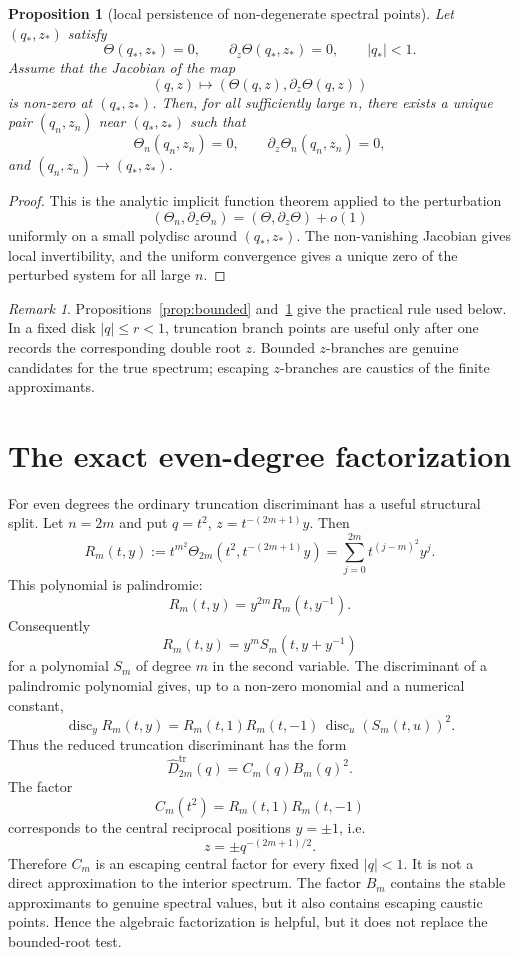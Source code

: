 \documentclass[11pt,a4paper,reqno]{amsart}
\newtheorem{proposition}[theorem]{Proposition}
\theoremstyle{remark}
\newtheorem{remark}[theorem]{Remark}
\newcommand{\disc}{\operatorname{disc}}
\newcommand{\Th}{\Theta}
\newcommand{\tr}{\mathrm{tr}}
\begin{document}
\begin{proposition}[local persistence of non-degenerate spectral points]\label{prop:persistence}
Let $(q_*,z_*)$ satisfy
\[
  \Th(q_*,z_*)=0,
  \qquad
  \partial_z\Th(q_*,z_*)=0,
  \qquad |q_*|<1.
\]
Assume that the Jacobian of the map
\[
  (q,z)\longmapsto (\Th(q,z),\partial_z\Th(q,z))
\]
is non-zero at $(q_*,z_*)$.  Then, for all sufficiently large $n$, there exists a unique pair $(q_n,z_n)$ near $(q_*,z_*)$ such that
\[
  \Th_n(q_n,z_n)=0,
  \qquad
  \partial_z\Th_n(q_n,z_n)=0,
\]
and $(q_n,z_n)\to(q_*,z_*)$.
\end{proposition}

\begin{proof}
This is the analytic implicit function theorem applied to the perturbation
\[
  (\Th_n,\partial_z\Th_n)=(\Th,\partial_z\Th)+o(1)
\]
uniformly on a small polydisc around $(q_*,z_*)$.  The non-vanishing Jacobian gives local invertibility, and the uniform convergence gives a unique zero of the perturbed system for all large $n$.
\end{proof}

\begin{remark}
Propositions~\ref{prop:bounded} and~\ref{prop:persistence} give the practical rule used below.  In a fixed disk $|q|\leq r<1$, truncation branch points are useful only after one records the corresponding double root $z$.  Bounded $z$-branches are genuine candidates for the true spectrum; escaping $z$-branches are caustics of the finite approximants.
\end{remark}

\section{The exact even-degree factorization}
For even degrees the ordinary truncation discriminant has a useful structural split.  Let $n=2m$ and put $q=t^2$, $z=t^{-(2m+1)}y$.  Then
\[
  R_m(t,y):=t^{m^2}\Th_{2m}(t^2,t^{-(2m+1)}y)
  =\sum_{j=0}^{2m}t^{(j-m)^2}y^j .
\]
This polynomial is palindromic:
\[
  R_m(t,y)=y^{2m}R_m(t,y^{-1}).
\]
Consequently
\[
  R_m(t,y)=y^m S_m(t,y+y^{-1})
\]
for a polynomial $S_m$ of degree $m$ in the second variable.  The discriminant of a palindromic polynomial gives, up to a non-zero monomial and a numerical constant,
\[
  \disc_y R_m(t,y)=R_m(t,1)R_m(t,-1)\,\disc_u(S_m(t,u))^2 .
\]
Thus the reduced truncation discriminant has the form
\[
  \widehat D^{\tr}_{2m}(q)=C_m(q)B_m(q)^2.
\]
The factor
\[
  C_m(t^2)=R_m(t,1)R_m(t,-1)
\]
corresponds to the central reciprocal positions $y=\pm1$, i.e.
\[
  z=\pm q^{-(2m+1)/2}.
\]
Therefore $C_m$ is an escaping central factor for every fixed $|q|<1$.  It is not a direct approximation to the interior spectrum.  The factor $B_m$ contains the stable approximants to genuine spectral values, but it also contains escaping caustic points.  Hence the algebraic factorization is helpful, but it does not replace the bounded-root test.
\end{document}
